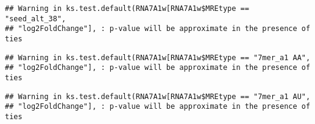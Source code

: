 \documentclass[
]{article}
\newenvironment{Shaded}{\begin{snugshade}}{\end{snugshade}}
\newcommand{\FunctionTok}[1]{\textcolor[rgb]{0.13,0.29,0.53}{\textbf{#1}}}
\newcommand{\NormalTok}[1]{#1}
\newcommand{\OtherTok}[1]{\textcolor[rgb]{0.56,0.35,0.01}{#1}}
\newcommand{\SpecialCharTok}[1]{\textcolor[rgb]{0.81,0.36,0.00}{\textbf{#1}}}
\newcommand{\StringTok}[1]{\textcolor[rgb]{0.31,0.60,0.02}{#1}}
\begin{document}
\begin{verbatim}
## Warning in ks.test.default(RNA7A1w[RNA7A1w$MREtype == "seed_alt_38",
## "log2FoldChange"], : p-value will be approximate in the presence of ties
\end{verbatim}

\begin{Shaded}
\end{Shaded}

\begin{verbatim}
## Warning in ks.test.default(RNA7A1w[RNA7A1w$MREtype == "7mer_a1 AA",
## "log2FoldChange"], : p-value will be approximate in the presence of ties
\end{verbatim}

\begin{Shaded}
\end{Shaded}

\begin{verbatim}
## Warning in ks.test.default(RNA7A1w[RNA7A1w$MREtype == "7mer_a1 AU",
## "log2FoldChange"], : p-value will be approximate in the presence of ties
\end{verbatim}

\begin{Shaded}
\end{Shaded}
\end{document}
